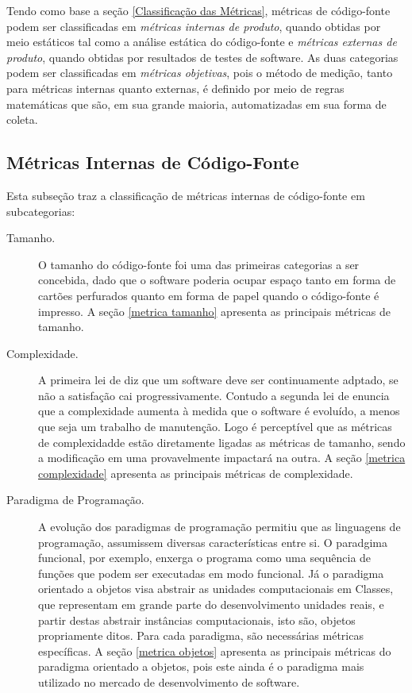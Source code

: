 		Tendo como base a seção \ref{Classificação das Métricas}, métricas de código-fonte podem ser classificadas em \textit{métricas internas de produto}, quando obtidas por meio estáticos tal como a análise estática do código-fonte e \textit{métricas externas de produto}, quando obtidas por resultados de testes de software. As duas categorias podem ser classificadas em \textit{métricas objetivas}, pois o método de medição, tanto para métricas internas quanto externas, é definido por meio de regras matemáticas que são, em sua grande maioria, automatizadas em sua forma de coleta.

	\subsection {Métricas Internas de Código-Fonte}
	\label {Métricas Internas de Código-Fonte}

	Esta subseção traz a classificação de métricas internas de código-fonte em subcategorias:

	\begin{description}
	\item [Tamanho.]  O tamanho do código-fonte foi uma das primeiras categorias a ser concebida, dado que o software poderia ocupar espaço tanto em forma de cartões perfurados quanto em forma de papel quando o código-fonte é impresso. A seção \ref{metrica tamanho} apresenta as principais métricas de tamanho. 

	\item [Complexidade.] A primeira lei de  diz que um software deve ser continuamente adptado, se não a satisfação cai progressivamente.  Contudo a segunda lei de  enuncia que a complexidade aumenta à medida que o software é evoluído, a menos que seja um trabalho de manutenção. Logo é perceptível que as métricas de complexidadde estão diretamente ligadas as métricas de tamanho, sendo a modificação em uma provavelmente impactará na outra. A seção \ref{metrica complexidade} apresenta as principais métricas de complexidade.

	\item [Paradigma de Programação.] A evolução dos paradigmas de programação permitiu que as linguagens de programação, assumissem diversas características entre si. O paradgima funcional, por exemplo, enxerga o programa como uma sequência de funções que podem ser executadas em modo funcional. Já o paradigma orientado a objetos visa abstrair as unidades computacionais em Classes, que representam em grande parte do desenvolvimento unidades reais, e partir destas abstrair instâncias computacionais, isto são, objetos propriamente ditos. Para cada paradigma, são necessárias métricas específicas. A seção \ref{metrica objetos} apresenta as principais métricas do paradigma orientado a objetos, pois este ainda é o paradigma mais utilizado no mercado de desenvolvimento de software. 
	\end{description}

